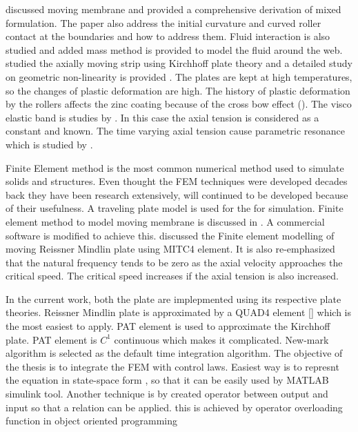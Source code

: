 \documentclass[main.tex]{subfiles}
\begin{document}
 \cite{moving_membrane_with_air_roller} discussed moving membrane and provided a comprehensive derivation of mixed formulation. The paper also address the initial curvature and curved roller contact at the boundaries and how to address them. Fluid interaction is also studied and added mass method is provided to model the fluid around the web. \cite{SAXINGER2016190} studied the axially moving strip using Kirchhoff plate theory and a detailed study on geometric non-linearity is provided .
The plates are kept at high temperatures, so the changes of plastic deformation are high. The history of plastic deformation by the rollers affects the zinc coating because of the cross bow effect (\cite{Baumgart2017}). The visco elastic band is studies by \cite{NumMethodBookString2013}.  In this case the axial tension is considered as a constant and known. The time varying axial tension cause parametric resonance which is studied by \cite{KIM2003679}.



Finite Element method is the most common numerical method used to simulate solids and structures. Even thought the FEM techniques were developed decades back they have been research extensively, will continued to be developed because of their usefulness. A traveling plate model is used for the for simulation. Finite element method to model moving membrane is discussed in \cite{non_moving_mem_fem}. A commercial software is modified to achieve this. \cite{WANG1999467} discussed the Finite element modelling of moving Reissner Mindlin plate using MITC4 element. It is also re-emphasized  that the natural frequency tends to be zero as the axial velocity approaches the critical speed. The critical speed increases if the axial tension is also increased. 


 

In the current work, both the plate are implepmented using its respective plate theories. Reissner Mindlin plate is approximated by a QUAD4 element [\cite{MATLAB_FEM}] which is the most easiest to apply. PAT element \cite{ZIENKIE_BOOK_STRUCT_CH11} is used to approximate the Kirchhoff plate. PAT element is $C^1$ continuous which makes it complicated. New-mark algorithm is selected as the default time integration algorithm.  The objective of the thesis is to integrate the FEM with control laws. Easiest way is to represnt the equation in state-space form \cite{FEM_MATLAB}, so that it can be easily used by MATLAB simulink tool. Another technique is by created operator between output and input so that a relation can be applied. this is achieved by operator overloading function in object oriented programming
\end{document}
